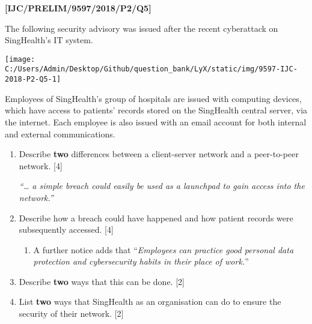 \quad{}
\item \textbf{{[}IJC/PRELIM/9597/2018/P2/Q5{]} }

The following security advisory was issued after the recent cyberattack
on SingHealth\textquoteright s IT system.
\begin{center}
\texttt{[image: C:/Users/Admin/Desktop/Github/question\_bank/LyX/static/img/9597-IJC-2018-P2-Q5-1]}
\par\end{center}

Employees of SingHealth\textquoteright s group of hospitals are issued
with computing devices, which have access to patients\textquoteright{}
records stored on the SingHealth central server, via the internet.
Each employee is also issued with an email account for both internal
and external communications. 
\begin{enumerate}
\item Describe \textbf{two} differences between a client-server network
and a peer-to-peer network. \hfill{}{[}4{]}

\emph{\textquotedblleft \dots{} a simple breach could easily be used
as a launchpad to gain access into the network.\textquotedblright{}}
\item Describe how a breach could have happened and how patient records
were subsequently accessed. \hfill{}{[}4{]}
\begin{enumerate}
\item A further notice adds that \textquotedblleft \emph{Employees can practice
good personal data protection and cybersecurity habits in their place
of work.}\textquotedblright{}
\end{enumerate}
\item Describe \textbf{two} ways that this can be done. \hfill{} {[}2{]}
\item List \textbf{two} ways that SingHealth as an organisation can do to
ensure the security of their network. \hfill{}{[}2{]}
\end{enumerate}
